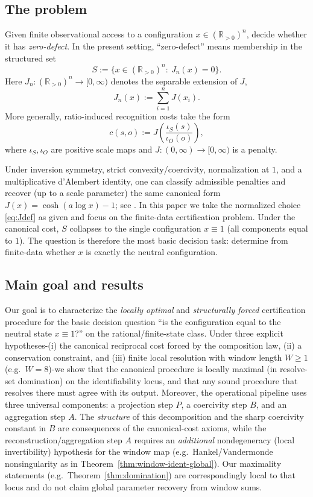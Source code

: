 \documentclass[11pt,reqno]{amsart}
\theoremstyle{definition}
\theoremstyle{remark}
\newcommand{\Rp}{\mathbb{R}_{>0}}
\newcommand{\1}{\mathbf{1}}
\begin{document}
\subsection{The problem}
Given finite observational access to a configuration $x\in(\Rp)^n$, decide whether it has
\emph{zero-defect}. In the present setting, ``zero-defect'' means membership in the structured
set
\[
S:=\{x\in(\Rp)^n:\ J_n(x)=0\}.
\]
\noindent Here \(J_n:(\Rp)^n\to[0,\infty)\) denotes the separable extension of \(J\),
\begin{equation}\label{eq:Jn}
J_n(x):=\sum_{i=1}^n J(x_i).
\end{equation}
More generally, ratio-induced recognition costs take the form
\begin{equation}\label{eq:cso}
c(s,o):=J\!\left(\frac{\iota_S(s)}{\iota_O(o)}\right),
\end{equation}
where $\iota_S,\iota_O$ are positive scale maps and $J:(0,\infty)\to[0,\infty)$ is a penalty.

Under inversion symmetry, strict convexity/coercivity, normalization at $1$, and a multiplicative
d'Alembert identity, one can classify admissible penalties and recover (up to a scale parameter) the same
canonical form $J(x)=\cosh(a\log x)-1$; see \cite{washburnbarghi2026RCC}. In this paper we take the
normalized choice \eqref{eq:Jdef} as given and focus on the finite-data certification problem. Under the canonical cost, $S$ collapses to the single configuration $x\equiv 1$ (all components
equal to $1$). The question is therefore the most basic decision task: determine from finite-data
whether $x$ is exactly the neutral configuration.
\subsection{Main goal and results}

Our goal is to characterize the \emph{locally optimal} and \emph{structurally forced} certification procedure for the basic decision question ``is the configuration equal to the neutral state $x\equiv 1$?'' on the rational/finite-state class. Under three explicit hypotheses-(i) the canonical reciprocal cost forced by the composition law, (ii) a conservation constraint, and (iii) finite local resolution with window length $W\ge 1$ (e.g.\ $W=8$)-we show that the canonical procedure is locally maximal (in resolve-set domination) on the identifiability locus, and that any sound procedure that resolves there must agree with its output. Moreover, the operational pipeline uses three universal components: a projection step $P$, a coercivity step $B$, and an aggregation step $A$. The \emph{structure} of this decomposition and the sharp coercivity constant in $B$ are consequences of the canonical-cost axioms, while the reconstruction/aggregation step $A$ requires an \emph{additional} nondegeneracy (local invertibility) hypothesis for the window map (e.g.\ Hankel/Vandermonde nonsingularity as in Theorem~\ref{thm:window-ident-global}). Our maximality statements (e.g.\ Theorem~\ref{thm:domination}) are correspondingly local to that locus and do not claim global parameter recovery from window sums.
\end{document}
